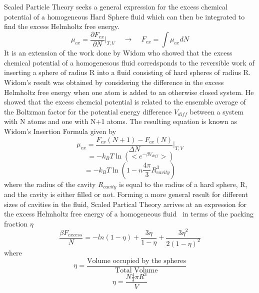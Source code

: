 \documentclass[double,12pt]{beavtex}
\begin{document}
Scaled Particle Theory seeks a general expression for the excess chemical 
potential of a homogeneous Hard Sphere fluid which can then be integrated 
to find the excess Helmholtz free energy.
\begin{equation}\mu_{ex}=\frac{\partial{F_{ex}}}{\partial{N}}\bigg|_{T,V}{~~~~~}\rightarrow{~~~~~}F_{ex}=\int{\mu_{ex}dN}\end{equation}
It is an extension of the work done by Widom who showed that the excess 
chemical potential of a homogenesous fluid corredsponds to the reversible 
work of inserting a sphere of radius R into a fluid consisting of hard 
spheres of radius R. Widom's result was obtained by considering the difference 
in the excess Helmholtz free energy when one atom is added to an otherwise 
closed system. He showed that the excess chemcial potential is related to 
the ensemble average of the Boltzman factor for the potential energy 
difference $V_{diff}$ between a system with N atoms and one with N+1 atoms. 
The resulting equation is known as Widom's Insertion Formula given by
\begin{equation}\mu_{ex}=\frac{F_{ex}(N+1)-F_{ex}(N)}{\Delta{N}}\bigg|_{T,V}\end{equation}
\begin{equation}\label{widoms-insertion-formula}{~}=-k_BT\ln\left(<e^{-\beta{V_{diff}}}>\right)\end{equation}
\color{red} \begin{equation}=-k_BT\ln(1-n\frac{4\pi}{3}R_{cavity}^3)\end{equation}
where the radius of the cavity $R_{cavity}$ is equal to the radius of a 
hard sphere, R, and the cavity is either filled or not. \color{black}
Forming a more general result for different sizes of cavities in the fluid, 
Scaled Partical Theory arrives at an expression for the excess Helmholtz 
free energy of a homogeneous fluid~\cite{Hansen} in terms of the packing fraction $\eta$ 
\begin{equation}\label{Fexcess-SPT}{\frac{\beta{F_{excess}}}{N}=-ln(1-\eta)+\frac{3\eta}{1-\eta}+\frac{3{\eta}^2}{2(1-\eta)^2}}\end{equation} 
where
\begin{equation}{\eta = \frac{\mbox{Volume occupied by the spheres}}{\mbox{Total Volume}}}\end{equation}
\begin{equation}{\eta = \frac{N\frac{4}{3}\pi{R^3}}{V}}\end{equation}
\end{document}

